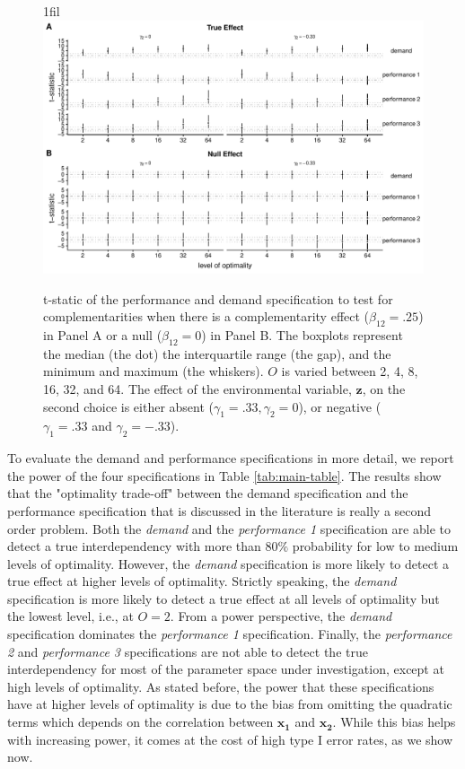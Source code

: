 \documentclass[12pt]{article}
\makeatletter
\newcommand*{\centerfloat}{%
  \parindent \z@
  \leftskip \z@ \@plus 1fil \@minus \textwidth
  \rightskip\leftskip
  \parfillskip \z@skip}
\makeatother
\begin{document}
\begin{figure}
\centerfloat
\includegraphics[width=450px]{figure-latex/main_new_plot.pdf}
\caption[Error Rate  and Power of Demand and Performance Specification]
{\label{main} t-static of the performance and demand specification to test
for complementarities when there is a complementarity effect ($\beta_{12} = .25$)
in Panel A or a null ($\beta_{12} = 0$) in Panel B. The boxplots represent the median (the dot) the interquartile range (the gap), and the minimum and maximum (the whiskers). $O$ is varied between 2, 4, 8, 16, 32, and 64. The effect of the environmental variable, $\mathbf{z}$, on the second choice is either absent ($\gamma_1 = .33,   \gamma_2 = 0$), or negative ($\gamma_1 = .33$ and $\gamma_2 = -.33$).}
\end{figure}



To evaluate the demand and performance specifications in more detail, we report the power of the four specifications in Table \ref{tab:main-table}. The results show that the "optimality trade-off" between the demand specification and the performance specification that is discussed in the literature \citep{grabner_management_2013, aral_three-way_2012, johansson_testing_2018} is really a second order problem. Both the \emph{demand} and the \emph{performance 1} specification are able to detect a true interdependency with more than $80\%$ probability for low to medium levels of optimality. However, the \emph{demand} specification is more likely to detect a true effect at higher levels of optimality. Strictly speaking, the \emph{demand} specification is more likely to detect a true effect at all levels of optimality but the lowest level, i.e., at \(O = 2\). From a power perspective, the \emph{demand} specification dominates the \emph{performance 1} specification. Finally, the \emph{performance 2} and \emph{performance 3} specifications are not able to detect the true interdependency for most of the parameter space under investigation, except at high levels of optimality. As stated before, the power that these specifications have at higher levels of optimality is due to the bias from omitting the quadratic terms which depends on the correlation between $\mathbf{x_1}$ and $\mathbf{x_2}$. While this bias helps with increasing power, it comes at the cost of high type I error rates, as we show now.
\end{document}
